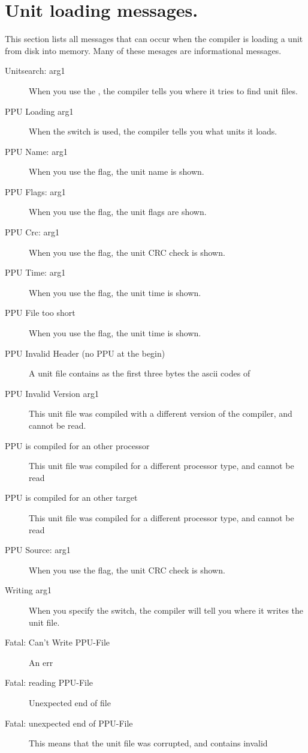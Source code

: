  \section{Unit loading messages.}
 This section lists all messages that can occur when the compiler is
 loading a unit from disk into memory. Many of these mesages are
 informational messages.
 \begin{description}
\item [Unitsearch: arg1]
 When you use the , the compiler tells you where it tries to find
 unit files.
\item [PPU Loading arg1]
 When the  switch is used, the compiler tells you
 what units it loads.
\item [PPU Name: arg1]
 When you use the  flag, the unit name is shown.
\item [PPU Flags: arg1]
 When you use the  flag, the unit flags are shown.
\item [PPU Crc: arg1]
 When you use the  flag, the unit CRC check is shown.
\item [PPU Time: arg1]
 When you use the  flag, the unit time is shown.
\item [PPU File too short]
 When you use the  flag, the unit time is shown.
\item [PPU Invalid Header (no PPU at the begin)]
 A unit file contains as the first three bytes the ascii codes of 
\item [PPU Invalid Version arg1]
 This unit file was compiled with a different version of the compiler, and
 cannot be read.
\item [PPU is compiled for an other processor]
 This unit file was compiled for a different processor type, and
 cannot be read
\item [PPU is compiled for an other target]
 This unit file was compiled for a different processor type, and
 cannot be read
\item [PPU Source: arg1]
 When you use the  flag, the unit CRC check is shown.
\item [Writing arg1]
 When you specify the  switch, the compiler will tell you where it
 writes the unit file.
\item [Fatal: Can't Write PPU-File]
 An err
\item [Fatal: reading PPU-File]
 Unexpected end of file
\item [Fatal: unexpected end of PPU-File]
 This means that the unit file was corrupted, and contains invalid

\end{description}
